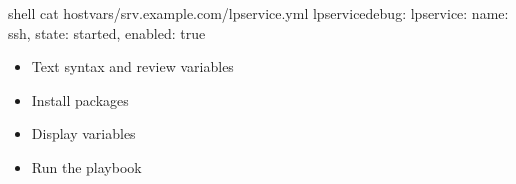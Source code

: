 \documentclass[letterpaper,10pt,english]{sphinxmanual}
\begin{document}
%
\begin{sphinxVerbatim}[commandchars=\\\{\},numbers=left,firstnumber=1,stepnumber=1]
shell\PYGZgt{} cat host\PYGZus{}vars/srv.example.com/lp\PYGZhy{}service.yml
lp\PYGZus{}service\PYGZus{}debug: 
lp\PYGZus{}service:
  \PYGZhy{} name: ssh, state: started, enabled: true
\end{sphinxVerbatim}
\sphinxresetverbatimhllines
\begin{itemize}
\item {} 
Text syntax and review variables

\begin{sphinxVerbatim}[commandchars=\\\{\}]
     
\end{sphinxVerbatim}

\item {} 
Install packages

\begin{sphinxVerbatim}[commandchars=\\\{\}]
    
\end{sphinxVerbatim}

\item {} 
Display variables

\begin{sphinxVerbatim}[commandchars=\\\{\}]
      
\end{sphinxVerbatim}

\item {} 
Run the playbook

\begin{sphinxVerbatim}[commandchars=\\\{\}]
  
\end{sphinxVerbatim}

\end{itemize}
\end{document}
